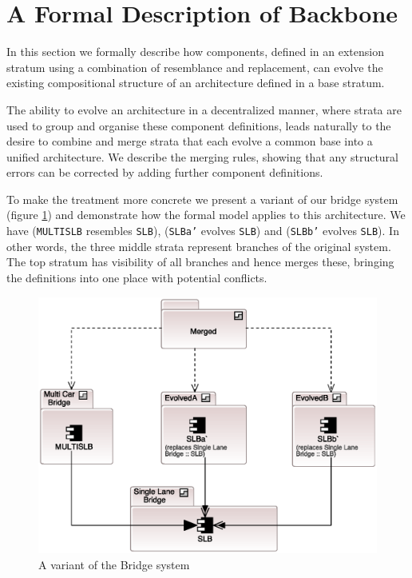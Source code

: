 
\section{\label{sec:A-Formal-Description}A Formal Description of Backbone}

In this section we formally describe how components, defined in an
extension stratum using a combination of resemblance and replacement,
can evolve the existing compositional structure of an architecture
defined in a base stratum.

The ability to evolve an architecture in a decentralized manner, where
strata are used to group and organise these component definitions,
leads naturally to the desire to combine and merge strata that each
evolve a common base into a unified architecture. We describe the
merging rules, showing that any structural errors can be corrected
by adding further component definitions.

To make the treatment more concrete we present a variant of our bridge
system (figure \ref{fig:A-variant-of}) and demonstrate how the formal
model applies to this architecture. We have (\texttt{MULTISLB} resembles
\texttt{SLB}), (\texttt{SLBa\textquoteright{}} evolves \texttt{SLB})
and (\texttt{SLBb\textquoteright{}} evolves \texttt{SLB}). In other
words, the three middle strata represent branches of the original
system. The top stratum has visibility of all branches and hence merges
these, bringing the definitions into one place with potential conflicts.

\begin{figure}[h]
\noindent \begin{centering}
\includegraphics[width=0.8\columnwidth]{images/formal-merged}
\par\end{centering}

\protect\caption{\label{fig:A-variant-of}A variant of the Bridge system}


\end{figure}


